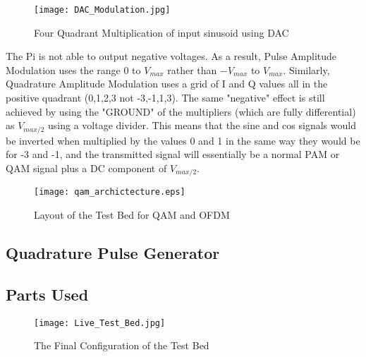 \documentclass[../main.tex]{subfiles}
\begin{document}
\begin{figure}[ht]
	\centering
	\texttt{[image: DAC\_Modulation.jpg]}
	\caption{Four Quadrant Multiplication of input sinusoid using DAC}
	\label{fig_}
\end{figure}

The Pi is not able to output negative voltages.
As a result, Pulse Amplitude Modulation uses the range $0$ to $V_{max}$ rather than $-V_{max}$ to $V_{max}$.
Similarly, Quadrature Amplitude Modulation uses a grid of I and Q values all in the positive quadrant (0,1,2,3 not -3,-1,1,3).
The same "negative" effect is still achieved by using the "GROUND" of the multipliers (which are fully differential)
as $V_{max/2}$ using a voltage divider.
This means that the sine and cos signals would be inverted when multiplied by the values 0 and 1 in the same way they would be for -3 and -1, and the transmitted signal will essentially be a normal PAM or QAM signal plus a DC component of $V_{max/2}$.

\begin{figure}[ht]
	\centering
	\texttt{[image: qam\_archictecture.eps]}
	\caption{Layout of the Test Bed for QAM and OFDM}
	\label{fig_QAM Layout}
\end{figure}

\subsection{Quadrature Pulse Generator}



\subsection{Parts Used}

\begin{figure}[ht]
	\centering
	\texttt{[image: Live\_Test\_Bed.jpg]}
	\caption{The Final Configuration of the Test Bed}
\end{figure}

\end{document}
